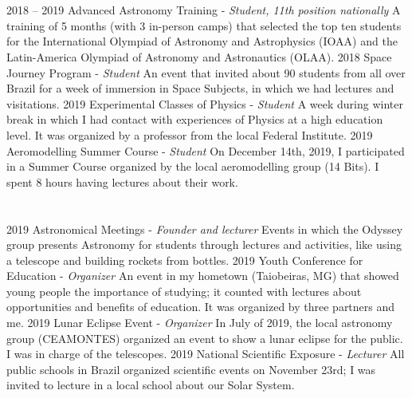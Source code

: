 \documentclass{cv}
\begin{document}
    \section*{}
        \begin{entrylist}
            \entry
                {2018 -- 2019}
                {Advanced Astronomy Training - {\textit{Student, 11th position nationally}}}
                {}
                {A training of 5 months (with 3 in-person camps) that selected the top ten students for the International Olympiad of Astronomy and Astrophysics (IOAA) and the Latin-America Olympiad of Astronomy and Astronautics (OLAA).}
            \entry
                {2018}
                {Space Journey Program - {\textit{Student}}}
                {}
                {An event that invited about 90 students from all over Brazil for a week of immersion in Space Subjects, in which we had lectures and visitations.}
            \entry
                {2019}
                {Experimental Classes of Physics - {\textit{Student}}}
                {}
                {A week during winter break in which I had contact with experiences of Physics at a high education level. It was organized by a professor from the local Federal Institute.}
            \entry
                {2019}
                {Aeromodelling Summer Course - {\textit{Student}}}
                {}
                {On December 14th, 2019, I participated in a Summer Course organized by the local aeromodelling group (14 Bits). I spent 8 hours having lectures about their work.}
        \end{entrylist}
    
    \section*{}
        \begin{entrylist}
            \entry
                {2019}
                {Astronomical Meetings - {\textit{Founder and lecturer}}}
                {}
                {Events in which the Odyssey group presents Astronomy for students through lectures and activities, like using a telescope and building rockets from bottles.}
            \entry
                {2019}
                {Youth Conference for Education - {\textit{Organizer}}}
                {}
                {An event in my hometown (Taiobeiras, MG) that showed young people the importance of studying; it counted with lectures about opportunities and benefits of education. It was organized by three partners and me.}
            \entry
                {2019}
                {Lunar Eclipse Event - {\textit{Organizer}}}
                {}
                {In July of 2019, the local astronomy group (CEAMONTES) organized an event to show a lunar eclipse for the public. I was in charge of the telescopes.}
            \entry
                {2019}
                {National Scientific Exposure - {\textit{Lecturer}}}
                {}
                {All public schools in Brazil organized scientific events on November 23rd; I was invited to lecture in a local school about our Solar System.}
        \end{entrylist}
\end{document}
